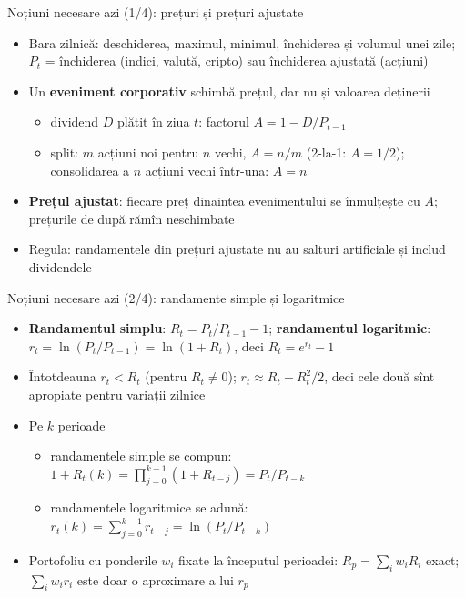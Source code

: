 \begin{frame}{Noțiuni necesare azi (1/4): prețuri și prețuri ajustate}
\itemsize{\small}
\begin{itemize}
    \item Bara zilnică: deschiderea, maximul, minimul, închiderea și volumul unei zile; $P_t$ = închiderea (indici, valută, cripto) sau închiderea ajustată (acțiuni)
    \item Un \textbf{eveniment corporativ} schimbă prețul, dar nu și valoarea deținerii
    \begin{itemize}
        \item dividend $D$ plătit în ziua $t$: factorul $A = 1 - D/P_{t-1}$
        \item split: $m$ acțiuni noi pentru $n$ vechi, $A = n/m$ (2-la-1: $A = 1/2$); consolidarea a $n$ acțiuni vechi într-una: $A = n$
    \end{itemize}
    \item \textbf{Prețul ajustat}: fiecare preț dinaintea evenimentului se înmulțește cu $A$; prețurile de după rămîn neschimbate
    \item Regula: randamentele din prețuri ajustate nu au salturi artificiale și includ dividendele
\end{itemize}
\end{frame}

\begin{frame}{Noțiuni necesare azi (2/4): randamente simple și logaritmice}
\itemsize{\small}
\begin{itemize}
    \item \textbf{Randamentul simplu}: $R_t = P_t/P_{t-1} - 1$; \textbf{randamentul logaritmic}: $r_t = \ln(P_t/P_{t-1}) = \ln(1 + R_t)$, deci $R_t = e^{r_t} - 1$
    \item Întotdeauna $r_t < R_t$ (pentru $R_t \neq 0$); $r_t \approx R_t - R_t^2/2$, deci cele două sînt apropiate pentru variații zilnice
    \item Pe $k$ perioade
    \begin{itemize}
        \item randamentele simple se compun: $1 + R_t(k) = \prod_{j=0}^{k-1}(1 + R_{t-j}) = P_t/P_{t-k}$
        \item randamentele logaritmice se adună: $r_t(k) = \sum_{j=0}^{k-1} r_{t-j} = \ln(P_t/P_{t-k})$
    \end{itemize}
    \item Portofoliu cu ponderile $w_i$ fixate la începutul perioadei: $R_p = \sum_i w_i R_i$ exact; $\sum_i w_i r_i$ este doar o aproximare a lui $r_p$
\end{itemize}
\end{frame}

